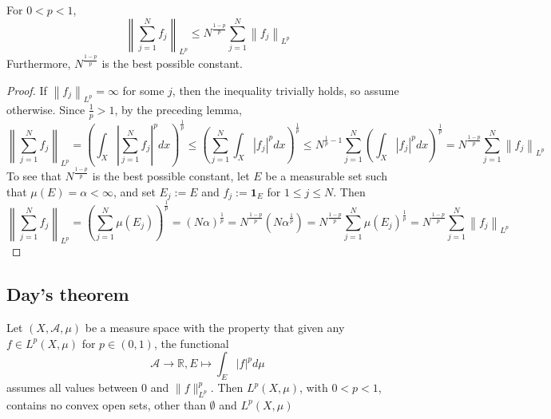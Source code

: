 \begin{proposition}
    For $0<p<1$,
    \[
        \left\|\sum_{j=1}^{N} f_{j}\right\|_{L^{p}} \leq N^{\frac{1-p}{p}} \sum_{j=1}^{N}\left\|f_{j}\right\|_{L^{p}}
    \]
    Furthermore, $N^{\frac{1-p}{p}}$ is the best possible constant.
\end{proposition}
\begin{proof}
    If $\left\|f_{j}\right\|_{L^{p}}=\infty$ for some $j$, then the inequality trivially holds, so assume otherwise. Since $\frac{1}{p}>1$, by the preceding lemma,
    \[
        \left\|\sum_{j=1}^{N} f_{j}\right\|_{L^{p}}=\left(\int_{X}\left|\sum_{j=1}^{N} f_{j}\right|^{p} d x\right)^{\frac{1}{p}} \leq\left(\sum_{j=1}^{N} \int_{X}\left|f_{j}\right|^{p} d x\right)^{\frac{1}{p}} \leq N^{\frac{1}{p}-1} \sum_{j=1}^{N}\left(\int_{X}\left|f_{j}\right|^{p} d x\right)^{\frac{1}{p}}=N^{\frac{1-p}{p}} \sum_{j=1}^{N}\left\|f_{j}\right\|_{L^{p}}
    \]
    To see that $N^{\frac{1-p}{p}}$ is the best possible constant, let $E$ be a measurable set such that $\mu(E)=\alpha<\infty$, and set $E_{j}:=E$ and $f_{j}:=\mathbf{1}_{E}$ for $1 \leq j \leq N$. Then
    \[
        \left\|\sum_{j=1}^{N} f_{j}\right\|_{L^{p}}=\left(\sum_{j=1}^{N} \mu\left(E_{j}\right)\right)^{\frac{1}{p}}=(N \alpha)^{\frac{1}{p}}=N^{\frac{1-p}{p}}\left(N \alpha^{\frac{1}{p}}\right)=N^{\frac{1-p}{p}} \sum_{j=1}^{N} \mu\left(E_{j}\right)^{\frac{1}{p}}=N^{\frac{1-p}{p}} \sum_{j=1}^{N}\left\|f_{j}\right\|_{L^{p}}
    \]
\end{proof}
\subsection{Day's theorem}
\begin{lemma}
    Let $(X, \mathcal{A}, \mu)$ be a measure space with the property that given any $f \in L^{p}(X, \mu)$ for $p \in(0,1)$, the functional
    \[
        \mathcal{A} \rightarrow \mathbb{R}, E \mapsto \int_{E}|f|^{p} d \mu
    \]
    assumes all values between 0 and $\|f\|_{L^{p}}^{p}$. Then $L^{p}(X, \mu)$, with $0<p<1$, contains no convex open sets, other than $\emptyset$ and $L^{p}(X, \mu)$
\end{lemma}

